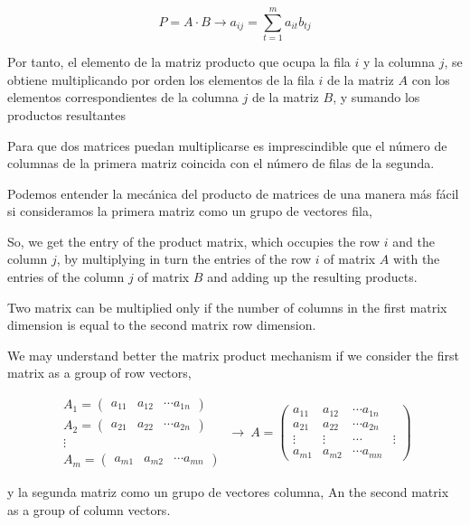 \begin{equation*}
P=A\cdot B \rightarrow a_{ij}=\sum_{t=1}^m a_{it}b_{tj}
\end{equation*}
\begin{paracol}{2}
Por tanto, el elemento de la matriz producto que ocupa la fila $i$ y la columna $j$, se obtiene multiplicando por orden los elementos de la fila $i$ de la matriz $A$ con los elementos correspondientes de la columna $j$ de la matriz $B$, y sumando los productos resultantes

Para que dos matrices puedan multiplicarse es imprescindible que el número de columnas de la primera matriz coincida con el número de filas de la segunda.

Podemos entender la mecánica del producto de matrices de una manera más fácil si consideramos  la primera matriz como un grupo de vectores fila,

\switchcolumn
So, we get the entry of the product matrix, which occupies the row $i$ and the column $j$, by multiplying in turn the entries of the row $i$ of matrix $A$ with the entries of the column $j$ of matrix $B$ and adding up the resulting products. 

Two matrix can be multiplied only if the number of columns in the first matrix dimension is equal to the second matrix row dimension.

We may understand better the matrix product mechanism if we consider the first matrix as a group of row vectors,  
\end{paracol}

\begin{equation*}
\begin{aligned}
A_1=\begin{pmatrix}
a_{11}& a_{12}& \cdots a_{1n}
\end{pmatrix}\\
A_2=\begin{pmatrix}
a_{21}& a_{22}& \cdots a_{2n}
\end{pmatrix}\\
\vdots \  \ \   \  \  \  \ \ \ \ \\
A_m=\begin{pmatrix}
a_{m1}& a_{m2}& \cdots a_{mn}
\end{pmatrix}
\end{aligned} \ \rightarrow \ 
A=\begin{pmatrix}
a_{11}& a_{12}& \cdots a_{1n}\\
a_{21}& a_{22}& \cdots a_{2n}\\
\vdots& \vdots& \cdots& \vdots \\
a_{m1}& a_{m2}& \cdots a_{mn}
\end{pmatrix}
\end{equation*}
\begin{paracol}{2}
y la segunda matriz como un grupo de vectores columna,
\switchcolumn
An the second matrix as a group of column vectors.  
\end{paracol}

